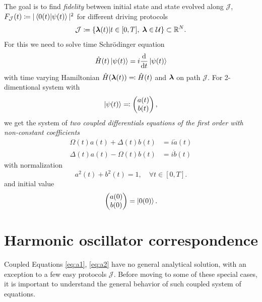 The goal is to find \emph{fidelity} between initial state and state evolved along $\mathcal J$, $F_{\mathcal J}(t)\coloneqq |\braket{0(t)|\psi(t)}|^2$ for different driving protocols \begin{equation}
    \mathcal J\coloneqq\{{\bm\lambda}(t)|t\in[0,T],\; {\bm\lambda}\in \mathcal U\} \subset \mathbb{R}^N.
\end{equation}
For this we need to solve time Schr\"odinger equation
\begin{equation}
    \hat{H}(t)\ket{\psi(t)}=i\frac{\mathrm{d}}{\mathrm{d} t}\ket{\psi(t)}
\end{equation}
with time varying Hamiltonian $\hat{H}({\bm\lambda}(t))\eqqcolon \hat{H}(t)$ and ${\bm\lambda}$ on path $\mathcal J$. For 2-dimentional system with 
\begin{equation}
    \ket{\psi(t)}\eqqcolon \begin{pmatrix}
         a(t) \\
         b(t)    
    \end{pmatrix},
\end{equation}
we get the system of \emph{two coupled differentials equations of the first order with non-constant coefficients}
\begin{align}
    \Omega(t)a(t)+\Delta(t)b(t)&=i\dot a(t)\label{eq:a1}\\
    \Delta(t)a(t)-\Omega(t)b(t)&=i\dot b(t)
    \label{eq:a2}
\end{align}
with normalization
\begin{equation}
    a^2(t)+b^2(t)=1, \quad \forall t\in [0,T].
    \label{eq:normalizationCondition}
\end{equation}
and initial value 
\begin{equation}
    \begin{pmatrix}
        a(0)\\b(0)
    \end{pmatrix} = \ket{0(0)}.
\end{equation}















\section{Harmonic oscillator correspondence}
Coupled Equations \ref{eq:a1}, \ref{eq:a2} have no general analytical solution, with an exception to a few easy protocols $\mathcal J$. Before moving to some of these special cases, it is important to understand the general behavior of such coupled system of equations.

